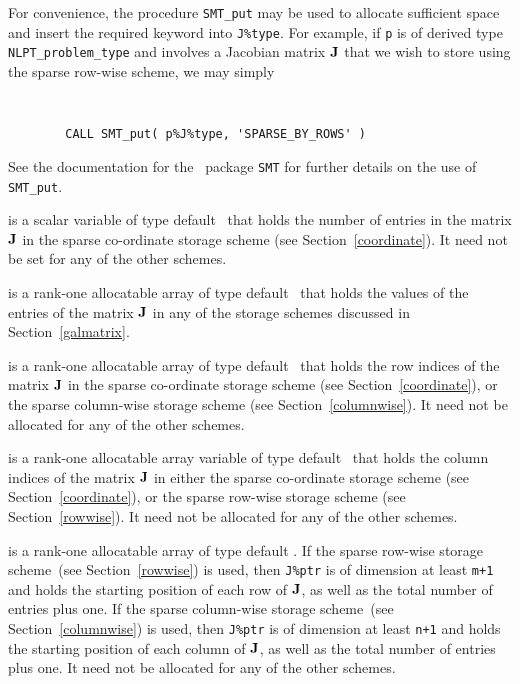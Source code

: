 \documentclass{galahad}
\begin{document}
\begin{description}
\begin{description}
For convenience, the procedure {\tt SMT\_put} may be used to allocate
sufficient space and insert the required keyword into {\tt J\%type}.
For example, if {\tt p} is of derived type {\tt NLPT\_problem\_type}
and involves a Jacobian matrix ${\mathbf{J}}$ that we wish to store using
the sparse row-wise scheme, we may simply
{\tt
\begin{verbatim}
        CALL SMT_put( p%J%type, 'SPARSE_BY_ROWS' )
\end{verbatim}
}
\noindent
See the documentation for the \galahad\ package {\tt SMT}
for further details on the use of {\tt SMT\_put}.

 is a scalar variable of type default \integer\ that holds
the number of entries in the matrix ${\mathbf{J}}$ in the sparse co-ordinate
storage scheme (see Section~\ref{coordinate}).  It need not be set for
any of the other schemes.

 is a rank-one allocatable array of type default \realdp\ that holds
the values of the entries of the matrix ${\mathbf{J}}$ in any of the
storage schemes discussed in Section~\ref{galmatrix}.

 is a rank-one allocatable array of type default \integer\
that holds the row indices of the matrix ${\mathbf{J}}$ in the sparse
co-ordinate storage scheme (see Section~\ref{coordinate}), or the
sparse column-wise storage scheme (see Section~\ref{columnwise}).  It
need not be allocated for any of the other schemes.

 is a rank-one allocatable array variable of type default
\integer\ that holds the column indices of the matrix ${\mathbf{J}}$ in
either the sparse co-ordinate storage scheme (see Section~\ref{coordinate}), or the
sparse row-wise storage scheme (see Section~\ref{rowwise}).  It need
not be allocated for any of the other schemes.

 is a rank-one allocatable array of type default
\integer.  If the sparse row-wise storage scheme~(see Section~\ref{rowwise})
is used, then {\tt J\%ptr} is of dimension at least {\tt m+1} and holds the
starting position of each row of ${\mathbf{J}}$, as well as the total number
of entries plus one.  If the sparse column-wise storage scheme~(see
Section~\ref{columnwise}) is used, then {\tt J\%ptr} is of dimension
at least {\tt n+1} and holds the starting position of each column of ${\mathbf{J}}$, as well as
the total number of entries plus one.  It need not be allocated for
any of the other schemes.


\end{description}
\end{description}
\end{document}
